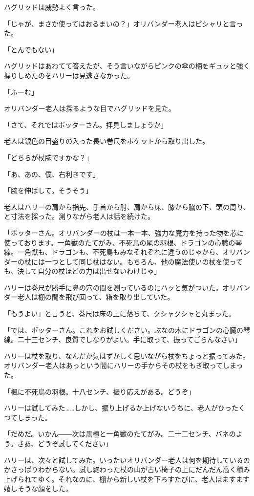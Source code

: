 \documentclass[10pt,a4paper]{article}
\begin{document}
\begin{CJK}{UTF8}{min}
ハグリッドは威勢よく言った。

「じゃが、まさか使ってはおるまいの？」オリバンダー老人はピシャリと言った。

「とんでもない」

ハグリッドはあわてて答えたが、そう言いながらピンクの傘の柄をギュッと強く握りしめたのをハリーは見逃さなかった。

「ふーむ」

オリバンダー老人は探るような目でハグリッドを見た。

「さて、それではポッターさん。拝見しましょうか」

老人は銀色の目盛りの入った長い巻尺をポケットから取り出した。

「どちらが杖腕ですかな？」

「あ、あの、僕、右利きです」

「腕を伸ばして。そうそう」

老人はハリーの肩から指先、手首から肘、肩から床、膝から脇の下、頭の周り、と寸法を採った。測りながら老人は話を続けた。

「ポッターさん。オリバンダーの杖は一本一本、強力な魔力を持った物を芯に使っております。一角獣のたてがみ、不死鳥の尾の羽根、ドラゴンの心臓の琴線。一角獣も、ドラゴンも、不死鳥もみなそれぞれに違うのじゃから、オリバンダーの杖には一つとして同じ杖はない。もちろん、他の魔法使いの杖を使っても、決して自分の杖ほどの力は出せないわけじゃ」

ハリーは巻尺が勝手に鼻の穴の間を測っているのにハッと気がついた。オリバンダー老人は棚の間を飛び回って、箱を取り出していた。

「もうよい」と言うと、巻尺は床の上に落ちて、クシャクシャと丸まった。

「では、ポッターさん。これをお試しください。ぶなの木にドラゴンの心臓の琴線。二十三センチ、良質でしなりがよい。手に取って、振ってごらんなさい」

ハリーは杖を取り、なんだか気はずかしく思いながら杖をちょっと振ってみた。オリバンダー老人はあっという間にハリーの手からその杖をもぎ取ってしまった。

「楓に不死鳥の羽根。十八センチ、振り応えがある。どうぞ」

ハリーは試してみた……しかし、振り上げるか上げないうちに、老人がひったくつてしまった。

「だめだ。いかん――次は黒檀と一角獣のたてがみ。二十二センチ、バネのよう。さあ、どうぞ試してください」

ハリーは、次々と試してみた。いったいオリバンダー老人は何を期待しているのかさっぱりわからない。試し終わった杖の山が古い椅子の上にだんだん高く積み上げられてゆく。それなのに、棚から新しい杖を下ろすたびに、老人はますます嬉しそうな顔をした。


\end{CJK}
\end{document}

